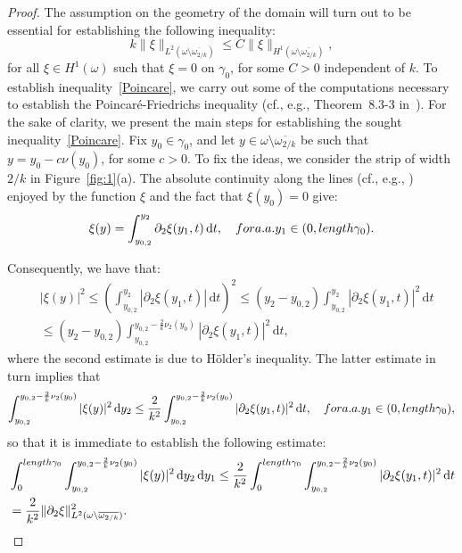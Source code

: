\documentclass{amsart}
\def\dd{\, \mathrm{d}}
\begin{document}
\begin{proof}
	The assumption on the geometry of the domain will turn out to be essential for establishing the following inequality:
	\begin{equation}
		\label{Poincare}
		k\|\xi\|_{L^2(\omega\setminus\overline{\omega_{2/k}})} \le C\|\xi\|_{H^1(\omega\setminus\overline{\omega_{2/k}})},
	\end{equation}
	for all $\xi\in H^1(\omega)$ such that $\xi=0$ on $\gamma_0$, for some $C>0$ independent of $k$. To establish inequality~\eqref{Poincare}, we carry out some of the computations necessary to establish the Poincar\'e-Friedrichs inequality (cf., e.g., Theorem~8.3-3 in~\cite{Ciarlet2025}). For the sake of clarity, we present the main steps for establishing the sought inequality~\eqref{Poincare}.
	Fix $y_0\in\gamma_0$, and let $y\in\omega\setminus\overline{\omega_{2/k}}$ be such that $y=y_0-c\nu(y_0)$, for some $c>0$.
	To fix the ideas, we consider the strip of width $2/k$ in Figure~\ref{fig:1}(a).
	The absolute continuity along the lines (cf., e.g., \cite{Leoni2017}) enjoyed by the function $\xi$ and the fact that $\xi(y_0)=0$ give:
	\begin{equation*}
		\xi(y)=\int_{y_{0,2}}^{y_2} \partial_2\xi(y_1,t) \dd t,\quad\textup{ for a.a. } y_1\in(0,\textup{length }\gamma_0).
	\end{equation*}
	
	Consequently, we have that:
	\begin{equation*}
		\begin{aligned}
		&|\xi(y)|^2\le \left(\int_{y_{0,2}}^{y_2} |\partial_2\xi(y_1,t)| \dd t\right)^2\le(y_2-y_{0,2})\int_{y_{0,2}}^{y_2} |\partial_2\xi(y_1,t)|^2 \dd t\\
		&\le (y_2-y_{0,2})\int_{y_{0,2}}^{y_{0,2}-\frac{2}{k}\nu_2(y_0)} |\partial_2\xi(y_1,t)|^2 \dd t,
		\end{aligned}
	\end{equation*}
	where the second estimate is due to H\"older's inequality.
	The latter estimate in turn implies that
	\begin{equation*}
		\int_{y_{0,2}}^{y_{0,2}-\frac{2}{k}\nu_2(y_0)} |\xi(y)|^2 \dd y_2 \le \dfrac{2}{k^2} \int_{y_{0,2}}^{y_{0,2}-\frac{2}{k}\nu_2(y_0)} |\partial_2\xi(y_1,t)|^2 \dd t,\quad\textup{ for a.a. }y_1\in(0,\textup{length }\gamma_0),
	\end{equation*}
	so that it is immediate to establish the following estimate:
	\begin{equation*}
		\begin{aligned}
		&\int_{0}^{\textup{length }\gamma_0} \int_{y_{0,2}}^{y_{0,2}-\frac{2}{k}\nu_2(y_0)} |\xi(y)|^2 \dd y_2 \dd y_1 \le \dfrac{2}{k^2}\int_{0}^{\textup{length }\gamma_0} \int_{y_{0,2}}^{y_{0,2}-\frac{2}{k}\nu_2(y_0)} |\partial_2\xi(y_1,t)|^2 \dd t\\
		&= \dfrac{2}{k^2} \|\partial_2\xi\|_{L^2(\omega\setminus\overline{\omega_{2/k}})}^2.
		\end{aligned}
	\end{equation*}
	

\end{proof}
\end{document}
